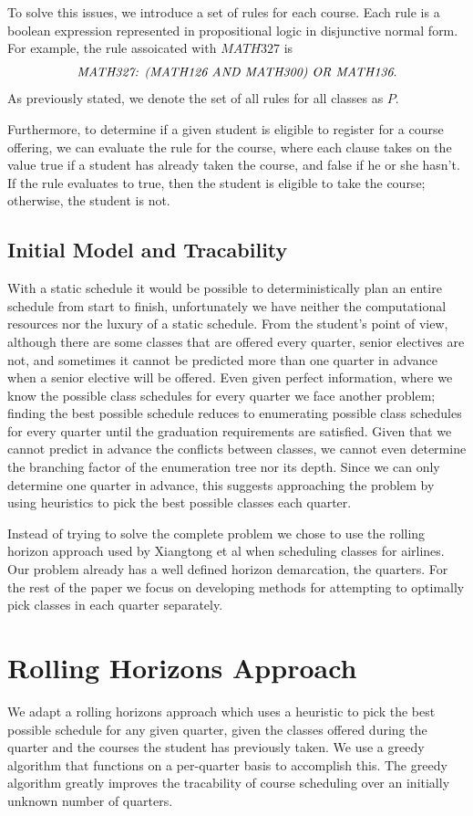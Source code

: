\documentclass[11pt]{article} %
\begin{document}
To solve this issues, we introduce a set of rules for each course. Each rule is a boolean expression represented in propositional logic in disjunctive normal form. For example, the rule assoicated with $MATH327$ is
$$
\text{{\it MATH327: (MATH126 AND MATH300) OR MATH136}}.
$$
As previously stated, we denote the set of all rules for all classes as $P$.

Furthermore, to determine if a given student is eligible to register for a course offering, we can evaluate the rule for the course, where each clause takes on the value true if a student has already taken the course, and false if he or she hasn't. If the rule evaluates to true, then the student is eligible to take the course; otherwise, the student is not.

\subsection{Initial Model and Tracability}
With a static schedule it would be possible to deterministically plan an entire schedule from start to finish, unfortunately we have neither the computational resources nor the luxury of a static schedule. From the student’s point of view, although there are some classes that are offered every quarter, senior electives are not, and sometimes it cannot be predicted more than one quarter in advance when a senior elective will be offered. Even given perfect information, where we know the possible class schedules for every quarter we face another problem; finding the best possible schedule reduces to enumerating possible class schedules for every quarter until the graduation requirements are satisfied. Given that we cannot predict in advance the conflicts between classes, we cannot even determine the branching factor of the enumeration tree nor its depth. Since we can only determine one quarter in advance, this suggests approaching the problem by using heuristics to pick the best possible classes each quarter.

Instead of trying to solve the complete problem we chose to use the rolling horizon approach used by Xiangtong et al \cite{xiangton:informs} when scheduling classes for airlines. Our problem already has a well defined horizon demarcation, the quarters. For the rest of the paper we focus on developing methods for attempting to optimally pick classes in each quarter separately.

\section{Rolling Horizons Approach}
We adapt a rolling horizons approach which uses a heuristic to pick the best possible schedule for any given quarter, given the classes offered during the quarter and the courses the student has previously taken. We use a greedy algorithm that functions on a per-quarter basis to accomplish this. The greedy algorithm greatly improves the tracability of course scheduling over an initially unknown number of quarters.
\end{document}
